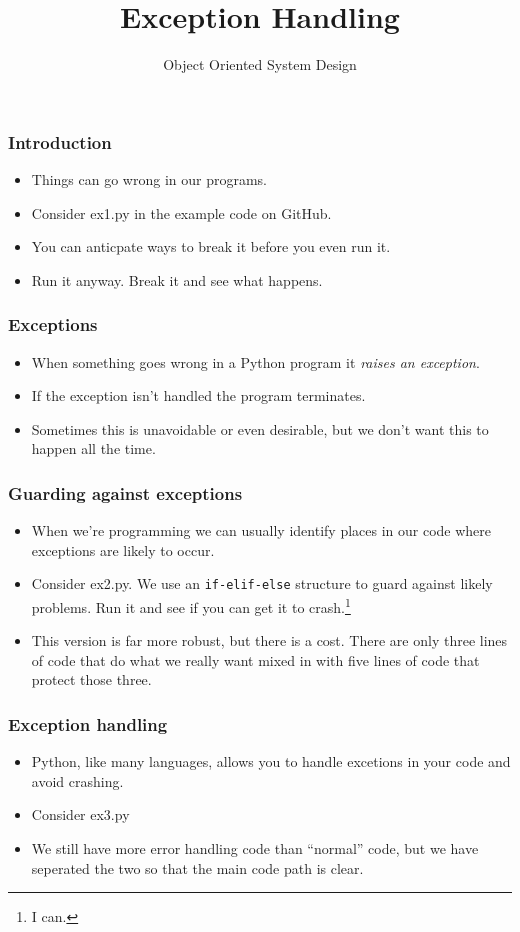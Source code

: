 \documentclass[10pt]{beamer}
\title{Exception Handling}
\author[IN710]{Object Oriented System Design}
\institute[Otago Polytechnic]{
  Otago Polytechnic \\
  Dunedin, New Zealand \\
}
\date{}
\begin{document}
\begin{frame}[plain]
  \titlepage
\end{frame}

\begin{frame}
  \frametitle{Introduction}

 \begin{itemize}
	 \item Things can go wrong in our programs.
	 \item Consider ex1.py in the example code on GitHub.
	 \item You can anticpate ways to break it before you even run it.
	 \item Run it anyway.  Break it and see what happens.
  \end{itemize}
\end{frame}

\begin{frame}
	\frametitle{Exceptions}
	\begin{itemize}
		\item When something goes wrong in a Python program
			it \emph{raises an exception}.
		\item If the exception isn't handled the program terminates.
		\item Sometimes this is unavoidable or even desirable,
			but we don't want this to happen all the time.
	\end{itemize}
\end{frame}

\begin{frame}
	\frametitle{Guarding against exceptions}
	\begin{itemize}
		\item When we're programming we can usually identify
			places in our code where exceptions are likely 
			to occur.
		\item Consider ex2.py.  We use an \texttt{if-elif-else} 
			structure to guard against likely problems.
		        Run it and see if you can get it to crash.\footnote{I can.}
		\item This version is far more robust, but there is a cost. 
			There are only three lines of code that do what we
			really want mixed in with five lines of code that
			protect those three.
	\end{itemize}
\end{frame}


\begin{frame}
	\frametitle{Exception handling}
	\begin{itemize}
		\item Python, like many languages, allows you to
			handle excetions in your code and avoid
			crashing.
		\item Consider ex3.py
		\item We still have more error handling code than
			``normal'' code, but we have seperated the two
			so that the main code path is clear.
	\end{itemize}
\end{frame}
\end{document}
